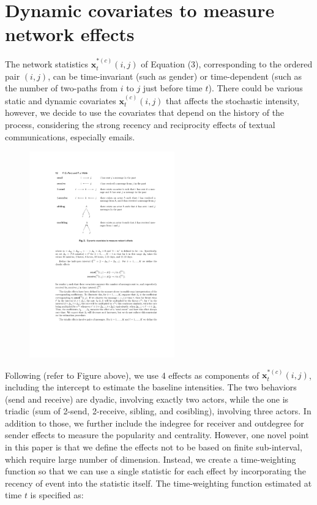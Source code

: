 \documentclass[a4paper]{article}
\begin{document}
  \section{Dynamic covariates to measure network effects} \label{subsec: Dynamic covariates}
 The network statistics $\boldsymbol{x}^{*(c)}_t(i, j)$ of Equation (3), corresponding to the ordered pair $(i, j)$, can be time-invariant (such as gender) or time-dependent (such as the number of two-paths from $i$ to $j$ just before time $t$). There could be various static and dynamic covariates $\boldsymbol{x}^{(c)}_t(i, j)$ that affects the stochastic intensity, however, we decide to use the covariates that depend on the history of the process, considering the strong recency and reciprocity effects of textual communications, especially emails. 
 \begin{figure}[ht]
 	\centering
 	\includegraphics[width=0.56\textwidth]{PerryWolfe.pdf} 
 	\label{fig:PerryWolfeplot}
 \end{figure}
  \newline Following \cite{PerryWolfe2012} (refer to Figure above), we use 4 effects as components of $\boldsymbol{x}^{*(c)}_t(i, j)$, including the intercept to estimate the baseline intensities. The two behaviors (send and receive) are dyadic, involving exactly two actors, while the one is triadic (sum of 2-send, 2-receive, sibling, and cosibling), involving three actors. In addition to those, we further include the indegree for receiver and outdegree for sender effects to measure the popularity and centrality. However, one novel point in this paper is that we define the effects not to be based on finite sub-interval, which require large number of dimension. Instead, we create a time-weighting function so that we can use a single statistic for each effect by incorporating the recency of event into the statistic itself. The time-weighting function estimated at time $t$ is specified as:
\end{document}
